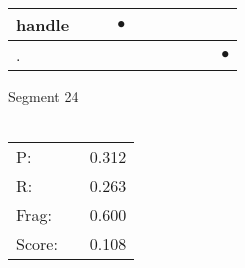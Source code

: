 \documentclass[landscape]{article}
\newcommand{\ssp}{\hspace{2pt}}
\newcommand{\mex}{\cellcolor{g}$\bullet$}
\begin{document}
\begin{tabular}{|l|p{10pt}|p{10pt}|p{10pt}|p{10pt}|p{10pt}|p{10pt}|p{10pt}|p{10pt}|p{10pt}|}
\hline
\ssp \cellcolor{ref2}handle \ssp&\hspace{2pt}&\hspace{2pt}&\hspace{2pt}\mex&\hspace{2pt}&\hspace{2pt}&\hspace{2pt}&\hspace{2pt}&\hspace{2pt}&\hspace{2pt}\\
\hline
\ssp \cellcolor{ref8}. \ssp&\hspace{2pt}&\hspace{2pt}&\hspace{2pt}&\hspace{2pt}&\hspace{2pt}&\hspace{2pt}&\hspace{2pt}&\hspace{2pt}&\hspace{2pt}\mex\\
\hline
\end{tabular}

\vspace{6pt}
\noindent Segment 24\\\\
\noindent\begin{tabular}{lm{12pt}r}
\hline
P:&&0.312\\
R:&&0.263\\
Frag:&&0.600\\
Score:&&0.108\\
\end{tabular}

\newpage
\end{document}
